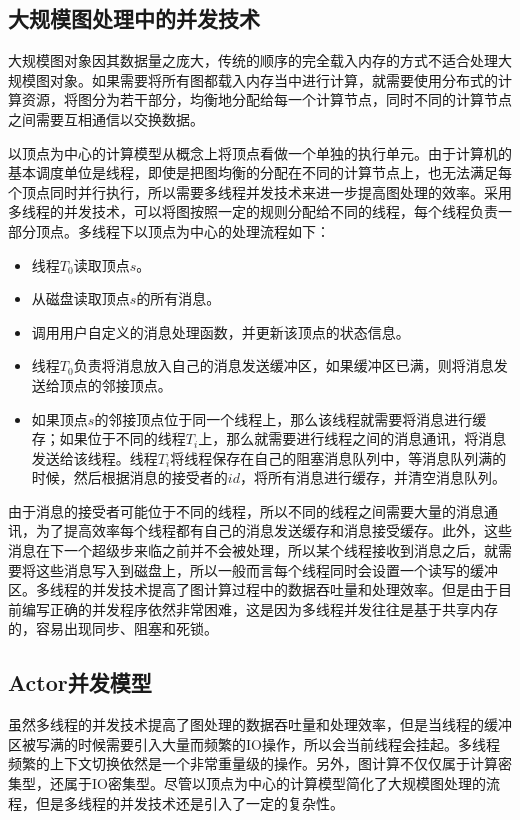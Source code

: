 \subsection{大规模图处理中的并发技术}

大规模图对象因其数据量之庞大，传统的顺序的完全载入内存的方式不适合处理大规模图对象。如果需要将所有图都载入内存当中进行计算，就需要使用分布式的计算资源，将图分为若干部分，均衡地分配给每一个计算节点，同时不同的计算节点之间需要互相通信以交换数据。

以顶点为中心的计算模型从概念上将顶点看做一个单独的执行单元。由于计算机的基本调度单位是线程，即使是把图均衡的分配在不同的计算节点上，也无法满足每个顶点同时并行执行，所以需要多线程并发技术来进一步提高图处理的效率。采用多线程的并发技术，可以将图按照一定的规则分配给不同的线程，每个线程负责一部分顶点。多线程下以顶点为中心的处理流程如下：
\begin{itemize}
\item 线程$T_0$读取顶点$s$。
\item 从磁盘读取顶点$s$的所有消息。
\item 调用用户自定义的消息处理函数，并更新该顶点的状态信息。
\item 线程$T_0$负责将消息放入自己的消息发送缓冲区，如果缓冲区已满，则将消息发送给顶点的邻接顶点。
\item 如果顶点$s$的邻接顶点位于同一个线程上，那么该线程就需要将消息进行缓存；如果位于不同的线程$T_i$上，那么就需要进行线程之间的消息通讯，将消息发送给该线程。线程$T_i$将线程保存在自己的阻塞消息队列中，等消息队列满的时候，然后根据消息的接受者的$id$，将所有消息进行缓存，并清空消息队列。
\end{itemize}

由于消息的接受者可能位于不同的线程，所以不同的线程之间需要大量的消息通讯，为了提高效率每个线程都有自己的消息发送缓存和消息接受缓存。此外，这些消息在下一个超级步来临之前并不会被处理，所以某个线程接收到消息之后，就需要将这些消息写入到磁盘上，所以一般而言每个线程同时会设置一个读写的缓冲区。多线程的并发技术提高了图计算过程中的数据吞吐量和处理效率。但是由于目前编写正确的并发程序依然非常困难，这是因为多线程并发往往是基于共享内存的，容易出现同步、阻塞和死锁\cite{srinivasan2006thread}。

\subsection{Actor并发模型}

虽然多线程的并发技术提高了图处理的数据吞吐量和处理效率，但是当线程的缓冲区被写满的时候需要引入大量而频繁的IO操作，所以会当前线程会挂起。多线程频繁的上下文切换依然是一个非常重量级的操作。另外，图计算不仅仅属于计算密集型，还属于IO密集型。尽管以顶点为中心的计算模型简化了大规模图处理的流程，但是多线程的并发技术还是引入了一定的复杂性。


